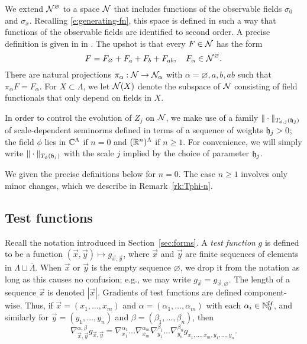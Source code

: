 We extend $\mathcal{N}^\varnothing$ to a space $\mathcal{N}$
that includes functions of the observable fields $\sigma_0$ and $\sigma_x$.
Recalling \eqref{e:generating-fn}, this space is defined in such a way that
functions of the observable fields are identified to second order. A precise
definition is given in
in \cite[Section~\ref{phi4-sec:phi4observables_representation}]{ST-phi4}.
The upshot is that every $F \in \mathcal{N}$ has the form
\begin{equation}
\label{e:obs-decomp}
F = F_\varnothing + F_a + F_b + F_{ab},
	\quad
F_\alpha \in \mathcal{N}^\varnothing.
\end{equation}
There are natural projections $\pi_\alpha : \mathcal{N} \rightarrow \mathcal{N}_\alpha$ with
$\alpha = \varnothing, a, b, ab$ such that $\pi_\alpha F = F_\alpha$.
For $X \subset \Lambda$, we let $\mathcal{N}(X)$ denote the subspace of $\mathcal{N}$ consisting
of field functionals that only depend on fields in $X$.

In order to control the evolution of $Z_j$ on $\mathcal{N}$, we make use of a family
$\|\cdot\|_{T_{\phi,j}(\mathfrak{h}_j)}$ of scale-dependent seminorms defined in terms of a
sequence of weights $\mathfrak{h}_j > 0$; the field $\phi$ lies in $\mathbb{C}^\Lambda$ if $n = 0$ and
$({\mathbb R}^n)^\Lambda$ if $n \ge 1$. For convenience,
we will simply write $\|\cdot\|_{T_\phi(\mathfrak{h}_j)}$ with the scale $j$ implied by the
choice of parameter $\mathfrak{h}_j$.

We given the precise definitions below for $n = 0$. The case $n \ge 1$ involves only
minor changes, which we describe in Remark~\ref{rk:Tphi-n}.


\subsection{Test functions}

Recall the notation introduced in Section~\ref{sec:forms}.
A \emph{test function} $g$ is defined to be a function $(\vec x, \vec y) \mapsto g_{\vec x,\vec y}$,
where $\vec x$ and $\vec y$ are finite sequences of elements in $\Lambda \sqcup \bar\Lambda$.
When $\vec x$ or $\vec y$ is the empty sequence $\varnothing$,
we drop it from the notation as long as this causes no confusion;
e.g., we may write $g_{\vec x} = g_{\vec x,\varnothing}$.
The length of a sequence $\vec x$ is denoted $|\vec x|$.
Gradients of test functions are defined component-wise.
Thus, if $\vec x = (x_1, \ldots, x_m)$
and $\alpha = (\alpha_1, \ldots, \alpha_m)$
with each $\alpha_i \in {\mathbb N}_0^{\mathcal{U}}$, and similarly for $\vec y=(y_1,\ldots,y_n)$ and
$\beta=(\beta_1,\ldots,\beta_n)$,
then
\begin{equation}
\nabla^{\alpha,\beta}_{\vec x,\vec y} g_{\vec x,\vec y}
  =
\nabla^{\alpha_1}_{x_1} \ldots \nabla^{\alpha_m}_{x_m}
\nabla^{\beta_1}_{y_1} \ldots \nabla^{\beta_n}_{y_n}  g_{x_1,\ldots,x_m,y_1,\ldots,y_n}.
\end{equation}

